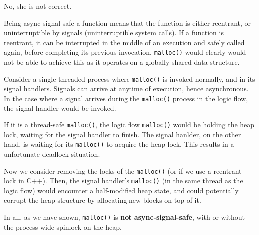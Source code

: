 \documentclass[12pt]{article}
\begin{document}
\subsubsection{}

No, she is not correct.

Being async-signal-safe a function means that the function is either reentrant, or uninterruptible by signals (uninterruptible system calls). If a function is reentrant, it can be interrupted in the middle of an execution and safely called again, before completing its previous invocation. \texttt{malloc()} would clearly would not be able to achieve this as it operates on a globally shared data structure.

Consider a single-threaded process where \texttt{malloc()} is invoked normally, and in its signal handlers. Signals can arrive at anytime of execution, hence asynchronous. In the case where a signal arrives during the \texttt{malloc()} process in the logic flow, the signal handler would be invoked. 

If it is a thread-safe \texttt{malloc()}, the logic flow \texttt{malloc()} would be holding the heap lock, waiting for the signal handler to finish. The signal hanlder, on the other hand, is waiting for its \texttt{malloc()} to acquire the heap lock. This results in a unfortunate deadlock situation.

Now we consider removing the locks of the \texttt{malloc()} (or if we use a reentrant lock in C++). Then, the signal handler's \texttt{malloc()} (in the same thread as the logic flow) would encounter a half-modified heap state, and could potentially corrupt the heap structure by allocating new blocks on top of it.

In all, as we have shown, \texttt{malloc()} is \textbf{not async-signal-safe}, with or without the process-wide spinlock on the heap.

\subsection{}

\subsubsection{}


\subsubsection{}


\newpage
\section{}
\end{document}
